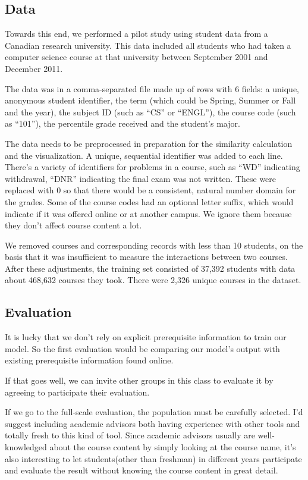 \subsection{Data}
\label{sec:data}

Towards this end, we performed a pilot study using student data from a Canadian research university.  This data included all students who had taken a computer science course at that university between September 2001 and December 2011.

The data was in a comma-separated file made up of rows with 6 fields:  a unique, anonymous student identifier, the term (which could be Spring, Summer or Fall and the year), the subject ID (such as “CS” or “ENGL”), the course code (such as “101”), the percentile grade received and the student’s major.

The data needs to be preprocessed in preparation for the similarity calculation and the visualization.  A unique, sequential identifier was added to each line.  There's a variety of identifiers for problems in a course, such as “WD” indicating withdrawal, “DNR” indicating the final exam was not written.  These were replaced with 0 so that there would be a consistent, natural number domain for the grades.  Some of the course codes had an optional letter suffix, which would indicate if it was offered online or at another campus.  We ignore them because they don't affect course content a lot.

We removed courses and corresponding records with less than 10 students, on the basis that it was insufficient to measure the interactions between two courses. After these adjustments, the training set consisted of 37,392 students with data about 468,632 courses they took. There were 2,326 unique courses in the dataset.

\subsection{Evaluation}
\label{sec:eval}

It is lucky that we don't rely on explicit prerequisite information to train our model. So the first evaluation would be comparing our model's output with existing prerequisite information found online.

If that goes well, we can invite other groups in this class to evaluate it by agreeing to participate their evaluation.

If we go to the full-scale evaluation, the population must be carefully selected. I'd suggest including academic advisors both having experience with other tools and totally fresh to this kind of tool. Since academic advisors usually are well-knowledged about the course content by simply looking at the course name, it's also interesting to let students(other than freshman) in different years participate and evaluate the result without knowing the course content in great detail.

